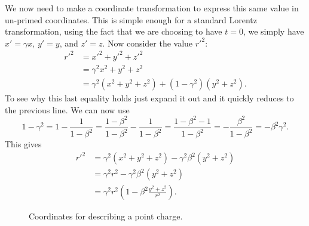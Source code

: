 We now need to make a coordinate transformation to express this same value in un-primed coordinates.
This is simple enough for a standard Lorentz transformation, using the fact that we are choosing to have \(t = 0\), we simply have \(x' = \gamma x\), \(y' = y\), and \(z' = z\).
Now consider the value \(r'^2\):
\begin{align}
    r'^2 &= x'^2 + y'^2 + z'^2\\
    &= \gamma^2 x^2 + y^2 + z^2\\
    &= \gamma^2(x^2 + y^2 + z^2) + (1 - \gamma^2)(y^2 + z^2).
\end{align}
To see why this last equality holds just expand it out and it quickly reduces to the previous line.
We can now use
\begin{equation}
    1 - \gamma^2 = 1 - \frac{1}{1 - \beta^2} = \frac{1 - \beta^2}{1 - \beta^2} - \frac{1}{1 - \beta^2} = \frac{1 - \beta^2 - 1}{1 - \beta^2} = -\frac{\beta^2}{1 - \beta^2} = -\beta^2\gamma^2.
\end{equation}
This gives
\begin{align}
    r'^2 &= \gamma^2(x^2 + y^2 + z^2) - \gamma^2\beta^2(y^2 + z^2)\\
    &= \gamma^2r^2 - \gamma^2\beta^2(y^2 + z^2)\\
    &= \gamma^2r^2\left( 1 - \beta^2\frac{y^2 + z^2}{r^2} \right).
\end{align}

\begin{figure}
    \caption{Coordinates for describing a point charge.}
    \label{fig:point charge geometry}
\end{figure}

